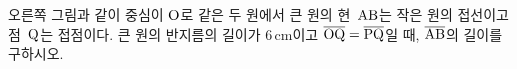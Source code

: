 \noindent\begin{minipage}[t]{0.58\linewidth}\vspace{0pt}\raggedright 오른쪽 그림과 같이 중심이 $\mathrm{O}$로 같은 두 원에서 큰 원의 현~$\mathrm{AB}$는 작은 원의 접선이고 점~$\mathrm{Q}$는 접점이다. 큰 원의 반지름의 길이가 $6\,\mathrm{cm}$이고 $\overline{\mathrm{OQ}}=\overline{\mathrm{PQ}}$일 때, $\overline{\mathrm{AB}}$의 길이를 구하시오. \end{minipage}\hfill\begin{minipage}[t]{0.4\linewidth}\vspace{0pt}\centering \resizebox{\ifdim\width>\linewidth\linewidth\else\width\fi}{!}{}\end{minipage}\par
